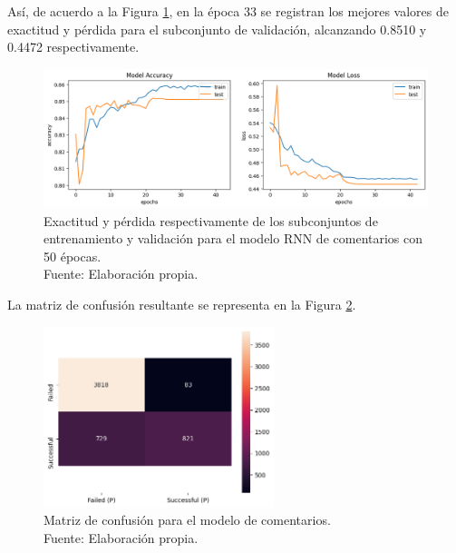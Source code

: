 Así, de acuerdo a la Figura \ref{5:fig7}, en la época 33 se registran los mejores valores de exactitud y pérdida para el subconjunto de validación, alcanzando 0.8510 y 0.4472 respectivamente.

\begin{figure}[!ht]
	\begin{center}
		\includegraphics[width=1\textwidth]{5/figures/comments_model_acc_loss.png}
		\caption[Exactitud y pérdida respectivamente de los subconjuntos de entrenamiento y validación para el modelo RNN de comentarios con 50 épocas]{Exactitud y pérdida respectivamente de los subconjuntos de entrenamiento y validación para el modelo RNN de comentarios con 50 épocas.\\
		Fuente: Elaboración propia.}
		\label{5:fig7}
	\end{center}
\end{figure}

La matriz de confusión resultante se representa en la Figura \ref{5:fig8}.
\begin{figure}[!ht]
	\begin{center}
		\includegraphics[width=0.60\textwidth]{5/figures/comments_confusion_matrix.png}
		\caption[Matriz de confusión para el modelo de comentarios]{Matriz de confusión para el modelo de comentarios.\\
		Fuente: Elaboración propia.}
		\label{5:fig8}
	\end{center}
\end{figure}

